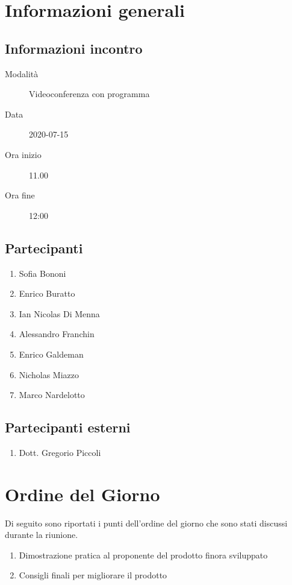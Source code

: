 \documentclass{article}
\begin{document}


\section{Informazioni generali}%
\label{sec:informazioni_generali}

\subsection{Informazioni incontro}%
\label{sub:informazioni_incontro}

\begin{description}
  \item[Modalità] Videoconferenza con programma 
  \item[Data] 2020-07-15
  \item[Ora inizio] 11.00
  \item[Ora fine] 12:00
\end{description}

\subsection{Partecipanti}%
\label{sub:partecipanti}

\begin{enumerate}
  \item Sofia Bononi
  \item Enrico Buratto
  \item Ian Nicolas Di Menna
  \item Alessandro Franchin
  \item Enrico Galdeman
  \item Nicholas Miazzo
  \item Marco Nardelotto
\end{enumerate}

\subsection{Partecipanti esterni}%
\label{sub:partecipanti esterni}

\begin{enumerate}
    \item Dott. Gregorio Piccoli
\end{enumerate}


\section{Ordine del Giorno}%
\label{ordine_del_giorno}
Di seguito sono riportati i punti dell'ordine del giorno che sono stati discussi durante la riunione.
\begin{enumerate}
  \item Dimostrazione pratica al proponente del prodotto finora sviluppato
  \item Consigli finali per migliorare il prodotto
\end{enumerate}
\end{document}
